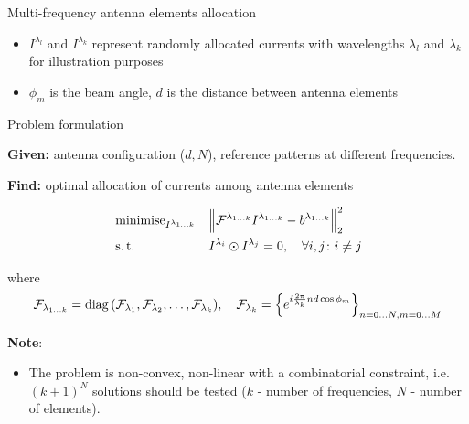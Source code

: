 \documentclass[../main.tex]{subfiles}
\begin{document}
\begin{frame}[t]{Multi-frequency antenna elements allocation}
\begin{figure}[H]
\begin{tikzpicture}
  \end{tikzpicture}
\end{figure}

\begin{itemize}
	\item $I^{\lambda_{l}}$ and $I^{\lambda_{k}}$ represent randomly allocated currents with wavelengths $\lambda_l$ and $\lambda_k$ for illustration purposes
	\item $\phi_{m}$ is the beam angle, $d$ is the distance between antenna elements
\end{itemize}

\end{frame}


%
%

\begin{frame}[t]{Problem formulation}

\textbf{Given:} antenna configuration ($d, N$), reference patterns at different frequencies.

\textbf{Find:} optimal allocation of currents among antenna elements
    
\begin{equation*}
\begin{aligned}
& \minimise_{I^{\lambda_{1\ldots k}}} 
& & \Big\| \mathcal{F}^{\lambda_{1 \ldots k}} I^{\lambda_{1\ldots k}} - b^{\lambda_{1 \ldots k}} \Big\|_2^2 \\
& \st
& & I^{\lambda_i} \odot I^{\lambda_j} = 0, \quad \forall i, j \colon i \ne j \\
\end{aligned}
\end{equation*}

where 
\begin{equation*}
  \mathcal{F}_{\lambda_{1 \ldots k}} = \diag{(\mathcal{F}_{\lambda_1}, \mathcal{F}_{\lambda_2}, \ldots, \mathcal{F}_{\lambda_k})}, \quad \mathcal{F}_{\lambda_{k}} = \Big\{ e^{i \frac{2\pi}{\lambda_k}n d \cos{\phi_m}} \Big\}_{n=0\ldots N, m = 0\ldots M}
\end{equation*}

\textbf{Note}: 
\begin{itemize}
    \item The problem is non-convex, non-linear with a combinatorial constraint, i.e. $(k+1)^N$ solutions should be tested ($k$ - number of frequencies, $N$ - number of elements).
\end{itemize}

\end{frame}
\end{document}

